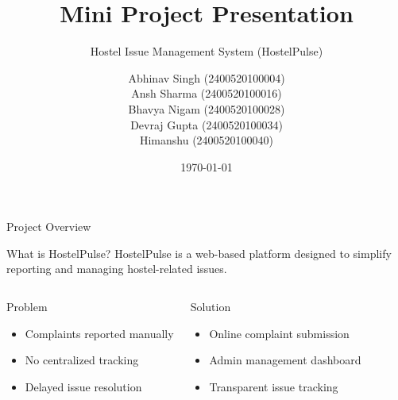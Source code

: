 \documentclass{beamer}
\title{Mini Project Presentation}
\subtitle{Hostel Issue Management System (HostelPulse)}
\author{
Abhinav Singh (2400520100004) \\
Ansh Sharma (2400520100016) \\
Bhavya Nigam (2400520100028) \\
Devraj Gupta (2400520100034) \\
Himanshu (2400520100040)
}
\date{\today}
\begin{document}
\begin{frame}
\titlepage
\end{frame}

\begin{frame}{Project Overview}

\begin{block}{What is HostelPulse?}
HostelPulse is a web-based platform designed to simplify reporting
and managing hostel-related issues.
\end{block}

\begin{columns}


\begin{alertblock}{Problem}
\begin{itemize}
\item Complaints reported manually
\item No centralized tracking
\item Delayed issue resolution
\end{itemize}
\end{alertblock}


\begin{block}{Solution}
\begin{itemize}
\item Online complaint submission
\item Admin management dashboard
\item Transparent issue tracking
\end{itemize}
\end{block}

\end{columns}

\end{frame}
\end{document}

